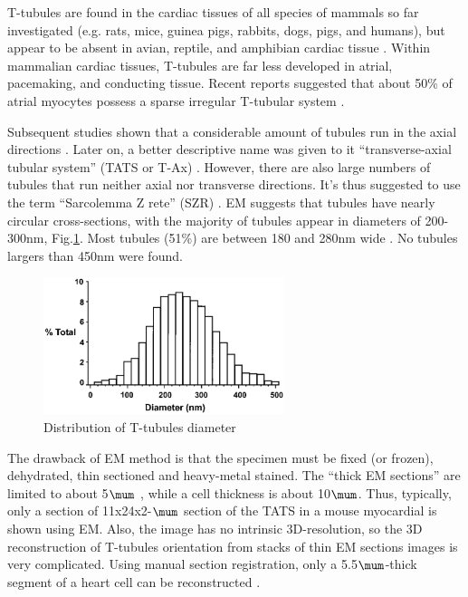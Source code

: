 T-tubules are found in the cardiac tissues of all species of mammals so far
investigated (e.g. rats, mice, guinea pigs, rabbits, dogs, pigs, and humans),
but appear to be absent in avian, reptile, and amphibian cardiac tissue
\citep{brette2003}. Within mammalian cardiac tissues, T-tubules are far less
developed in atrial, pacemaking, and conducting tissue. Recent reports
suggested that about 50\% of atrial myocytes possess a sparse irregular
T-tubular system \citep{kirk2003, richards2011}.


Subsequent studies shown that a considerable amount of tubules run in the axial
directions \citep{forssmann1970, sperelakis1971}.
Later on, a better descriptive name was given to it ``transverse-axial tubular
system'' (TATS or T-Ax) \citep{forbes1984, amsellem1995}. However, there are
also large numbers of tubules that run neither axial nor transverse directions.
It's thus suggested to use the term ``Sarcolemma Z rete'' (SZR)
\citep{soeller1999}. EM suggests that tubules have nearly circular
cross-sections, with the majority of tubules appear in diameters of 200-300nm,
Fig.\ref{fig:T-tubules_diameter}. Most tubules (51\%) are between 180 and 280nm
wide \citep{soeller1999}. No tubules largers than 450nm were found.

\begin{figure}[hbt]
  \centerline{\includegraphics[height=4cm,
    angle=0]{./images/T-tubule_diameter.eps}}
\caption{Distribution of T-tubules diameter \citep{soeller1999}}
\label{fig:T-tubules_diameter}
\end{figure}



\begin{framed}
The drawback of EM method is that the specimen must be fixed (or frozen),
dehydrated, thin sectioned and heavy-metal stained. The ``thick EM sections''
are limited to about 5$\mum$ \citep{peachey1986}, while a cell thickness is
about 10$\mum$. Thus, typically, only a section of 11x24x2-$\mum$ section of the
TATS in a mouse myocardial is shown using EM. Also, the image has no intrinsic
3D-resolution, so the 3D reconstruction of T-tubules orientation from stacks of
thin EM sections images is very complicated. Using manual section registration,
only a 5.5$\mum$-thick segment of a heart cell can be reconstructed
\citep{amsellem1995}.
\end{framed}

